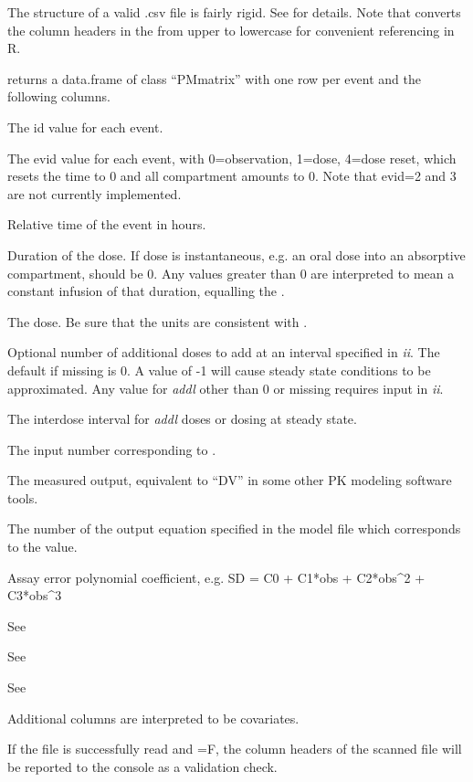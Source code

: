 \documentclass[a4paper]{book}
\begin{document}
%
\begin{Details}\relax
The structure of a valid .csv file is fairly rigid.  See 
for details.  Note that  converts the column headers in the
 from upper to lowercase for convenient referencing in R.
\end{Details}
%
\begin{Value}
 returns a data.frame of class ``PMmatrix'' with one row per
event and the following columns.  
\begin{ldescription}
\item[\code{id }] The id value for each event.
\item[\code{evid }] The evid value for each event, with 0=observation, 1=dose, 4=dose reset, which resets the time to 0 and all compartment amounts to 0.  Note that evid=2 and 3 are not currently implemented.
\item[\code{time }] Relative time of the event in hours.
\item[\code{dur }] Duration of the dose.  If dose is instantaneous, e.g. an oral dose into an absorptive compartment,  should be 0.  Any values greater than 0 are interpreted to mean a constant infusion of that duration, equalling the .
\item[\code{dose }] The dose.  Be sure that the units are consistent with .
\item[\code{addl }] Optional number of additional doses to add at an interval specified in \emph{ii}.  The default if missing is 0.  A value of -1
will cause steady state conditions to be approximated.  Any value for \emph{addl} other than 0 or missing requires input in \emph{ii}.
\item[\code{ii }] The interdose interval for \emph{addl} doses or dosing at steady state.
\item[\code{input }] The input number corresponding to .
\item[\code{out }] The measured output, equivalent to ``DV'' in some other PK modeling software tools.
\item[\code{outeq }] The number of the output equation specified in the model file which corresponds to the  value.
\item[\code{C0 }] Assay error polynomial coefficient, e.g. SD = C0 + C1*obs + C2*obs\textasciicircum{}2 + C3*obs\textasciicircum{}3
\item[\code{C1 }] See 
\item[\code{C2 }] See 
\item[\code{C3 }] See 
\item[\code{... }] Additional columns are interpreted to be covariates.
\end{ldescription}
If the file is successfully read and =F,
the column headers of the scanned file will be reported to the console as a validation check.
\end{Value}
\end{document}
